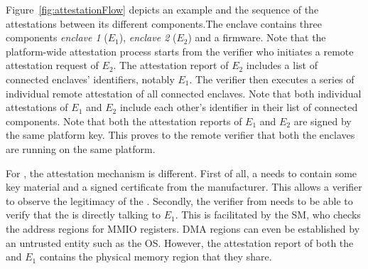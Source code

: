 
Figure~\ref{fig:attestationFlow} depicts an example \nameenclave{} and the sequence of the attestations between its different components.The \name enclave contains three components \emph{enclave 1} ($E_1$), \emph{enclave 2} ($E_2$) and a \sphw firmware. Note that the platform-wide attestation process starts from the verifier who initiates a remote attestation request of $E_2$. 
The attestation report of $E_2$ includes a list  of connected enclaves' identifiers, notably $E_1$. The verifier then executes a series of individual remote attestation of all connected enclaves. Note that both individual attestations of $E_1$ and $E_2$ include each other's identifier in their list of connected components. Note that both the attestation reports of $E_1$ and $E_2$ are signed by the same platform key. This proves to the remote verifier that both the enclaves are running on the same platform.

For \sphw, the attestation mechanism is different. First of all, a \sphw needs to contain some key material and a signed certificate from the manufacturer. This allows a verifier to observe the legitimacy of the \sphw. Secondly, the verifier from  needs to be able to verify that the \sphw is directly talking to $E_1$. This is facilitated by the SM, who checks the address regions for MMIO registers. DMA regions can even be established by an untrusted entity such as the OS. However, the attestation report of both the \sphw and $E_1$ contains the physical memory region that they share.

